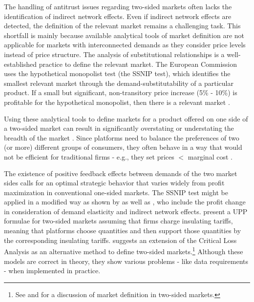 \documentclass[12pt,a4paper,notitlepage]{article}
\begin{document}
The handling of antitrust issues regarding two-sided markets often lacks the identification of indirect network effects. Even if indirect network effects are detected, the definition of the relevant market remains a challenging task. This shortfall is mainly because available analytical tools of market definition are not applicable for markets with interconnected demands as they consider price levels instead of price structure. The analysis of substitutional relationships is a well-established practice to define the relevant market. The European Commission uses the hypothetical monopolist test (the SSNIP test), which identifies the smallest relevant market through the demand-substitutability of a particular product. If a small but significant, non-transitory price increase (5\% - 10\%) is profitable for the hypothetical monopolist, then there is a relevant market \citep{motta_competition_2004}. 

Using these analytical tools to define markets for a product offered on one side of a two-sided market can result in significantly overstating or understating the breadth of the market \citep{evans_analysis_2008}. Since platforms need to balance the preferences of two (or more) different groups of consumers, they often behave in a way that would not be efficient for traditional firms - e.g., they set prices $<$ marginal cost \citep{chandra_mergers_2009}.

The existence of positive feedback effects between demands of the two market sides calls for an optimal strategic behavior that varies widely from profit maximization in conventional one-sided markets. The SSNIP test might be applied in a modified way as shown by \citet{filistrucchi_market_2013} as well as \citet{evans_defining_2007}, who include the profit change in consideration of demand elasticity and indirect network effects. \citet{white_insulated_2012} present a UPP formulae for two-sided markets assuming that firms charge insulating tariffs, meaning that platforms choose quantities and then support those quantities by the corresponding insulating tariffs. \citet{noel_analyzing_2005} suggests an extension of the Critical Loss Analysis as an alternative method to define two-sided markets.\footnote{See \citet{evans_two-sided_2012} and \citet{filistrucchi_identifying_2012} for a discussion of market definition in two-sided markets.} Although these models are correct in theory, they show various problems - like data requirements - when implemented in practice. 
\end{document}
